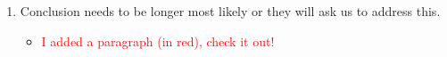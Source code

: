 \documentclass[letterpaper, parskip]{scrartcl}
\begin{document}
\begin{enumerate}
%
%
\item Conclusion needs to be longer most likely or they will ask us to address this.
\begin{itemize}
	\item \textcolor{red}{I added a paragraph (in red), check it out!}
\end{itemize}
 

\end{enumerate}
\end{document}
